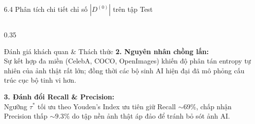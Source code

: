 \documentclass[aspectratio=169, 10pt, t]{beamer}
\begin{document}
\begin{frame}{6.4 Phân tích chi tiết chỉ số $|D^{(0)}|$ trên tập Test}
\begin{columns}[T, totalwidth=\linewidth]
\begin{column}{0.35\linewidth}
\begin{cleanbox}[top=1.0mm, bottom=1.0mm]{Đánh giá khách quan \& Thách thức}
        \textbf{2. Nguyên nhân chồng lấn:}\\
        Sự kết hợp đa miền (CelebA, COCO, OpenImages) khiến độ phân tán entropy tự nhiên của ảnh thật rất lớn; đồng thời các bộ sinh AI hiện đại đã mô phỏng cấu trúc cục bộ tinh vi hơn.
        \vspace{0.15em}

        \textbf{3. Đánh đổi Recall \& Precision:}\\
        Ngưỡng $\tau^*$ tối ưu theo Youden's Index ưu tiên giữ Recall $\sim 69\%$, chấp nhận Precision thấp $\sim 9.3\%$ do tập nền ảnh thật áp đảo để tránh bỏ sót ảnh AI.
      \end{cleanbox}
    \end{column}
  \end{columns}
\end{frame}
\end{document}
